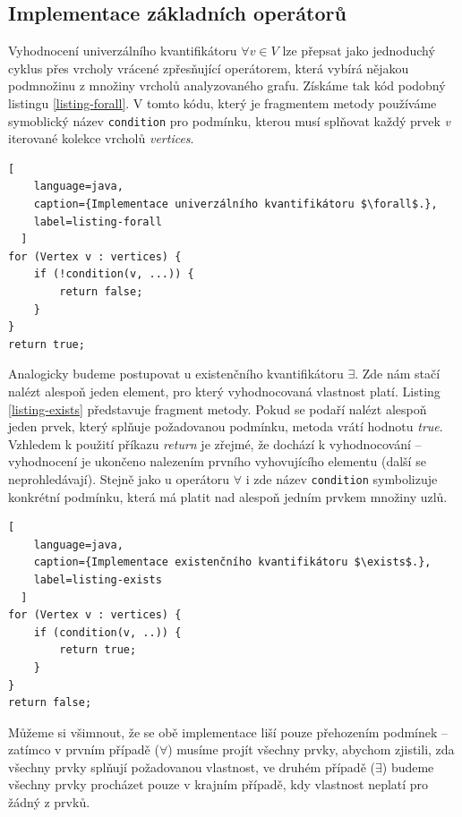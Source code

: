 \subsection{Implementace základních operátorů}
Vyhodnocení univerzálního kvantifikátoru $\forall v \in V$ lze přepsat jako jednoduchý cyklus přes vrcholy vrácené zpřesňující operátorem, která vybírá nějakou podmnožinu z množiny vrcholů analyzovaného grafu. Získáme tak kód podobný listingu \ref{listing-forall}. V tomto kódu, který je fragmentem metody používáme symoblický název \verb+condition+ pro podmínku, kterou musí splňovat každý prvek \emph{v} iterované kolekce vrcholů \emph{vertices}.

\begin{lstlisting}[
    language=java,
    caption={Implementace univerzálního kvantifikátoru $\forall$.},
    label=listing-forall
  ]
for (Vertex v : vertices) {
    if (!condition(v, ...)) {
        return false;
    }
}
return true;
\end{lstlisting}

Analogicky budeme postupovat u existenčního kvantifikátoru $\exists$. Zde nám stačí nalézt alespoň jeden element, pro který vyhodnocovaná vlastnost platí. Listing \ref{listing-exists} představuje fragment metody. Pokud se podaří nalézt alespoň jeden prvek, který splňuje požadovanou podmínku, metoda vrátí hodnotu \emph{true}. Vzhledem k použití příkazu \emph{return} je zřejmé, že dochází k  vyhodnocování -- vyhodnocení je ukončeno nalezením prvního vyhovujícího elementu (další se neprohledávají). Stejně jako u operátoru $\forall$ i zde název \verb+condition+ symbolizuje konkrétní podmínku, která má platit nad alespoň jedním prvkem množiny uzlů.

\begin{lstlisting}[
    language=java,
    caption={Implementace existenčního kvantifikátoru $\exists$.},
    label=listing-exists
  ]
for (Vertex v : vertices) {
    if (condition(v, ..)) {
        return true;
    }
}
return false;
\end{lstlisting}

Můžeme si všimnout, že se obě implementace liší pouze přehozením podmínek -- zatímco v prvním případě ($\forall$) musíme projít všechny prvky, abychom zjistili, zda všechny prvky splňují požadovanou vlastnost, ve druhém případě ($\exists$) budeme všechny prvky procházet pouze v krajním případě, kdy vlastnost neplatí pro žádný z prvků.

